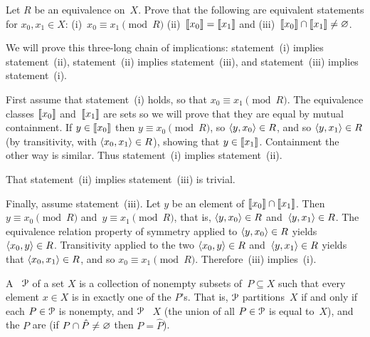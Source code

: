 \documentclass{ibl}  %
\begin{document}
\begin{problem} Let $R$ be an equivalence on~$X$.
Prove that the following are equivalent statements for $x_0,x_1\in X$:
(i)~$x_0\equiv x_1\pmod R$
(ii)~$\llbracket x_0 \rrbracket=\llbracket x_1 \rrbracket$    
and (iii)~$\llbracket x_0 \rrbracket\cap\llbracket x_1 \rrbracket\neq \varnothing$.
\begin{answer}
We will prove this three-long chain of implications: 
statement~(i) implies statement~(ii),
statement~(ii) implies statement~(iii),
and
statement~(iii) implies statement~(i).

First assume that statement~(i) holds, so that $x_0\equiv x_1\pmod R$.
The equivalence classes $\llbracket x_0 \rrbracket$ and~$\llbracket x_1 \rrbracket$ are sets so
we will prove that they are equal by mutual containment.
If $y\in\llbracket x_0 \rrbracket$ then $y\equiv x_0 \pmod R$,
so $\langle y,x_0\rangle\in R$, and so $\langle y,x_1\rangle\in R$
(by transitivity, with $\langle x_0,x_1\rangle\in R$),
showing that $y\in\llbracket x_1 \rrbracket$.
Containment the other way is similar.
Thus statement~(i) implies statement~(ii).

That statement~(ii) implies statement~(iii) is trivial.

Finally, assume statement~(iii).
Let $y$ be an element of $\llbracket x_0 \rrbracket\cap\llbracket x_1 \rrbracket$.
Then $y\equiv x_0\pmod R$ and~$y\equiv x_1\pmod R$,
that is, $\langle y,x_0\rangle\in R$ and~$\langle y,x_1\rangle\in R$.
The equivalence relation property of 
symmetry applied to $\langle y,x_0\rangle\in R$ yields~$\langle x_0,y\rangle\in R$.
Transitivity applied to the 
two $\langle x_0,y\rangle\in R$ and~$\langle y,x_1\rangle\in R$ yields
that $\langle x_0,x_1\rangle\in R$, and so $x_0\equiv x_1\pmod R$.
Therefore~(iii) implies~(i).
\end{answer}
\end{problem}

\begin{df}
A ~$\EuScript{P}$ of a set $X$ is a 
collection of nonempty subsets of~$P\subseteq X$ such that every 
element $x\in X$ is in exactly one of the $P$'s.
That is, $\EuScript{P}$ partitions~$X$ if and only if each
$P\in\EuScript{P}$ is nonempty,
and $\EuScript{P}$ ~$X$
(the union of all $P\in\EuScript{P}$ is equal to~$X$),
and the $P$ are 
(if $P\cap \hat{P}\neq\varnothing$ then $P=\hat{P}$).
\end{df}

\begin{center}
\end{center}
\end{document}
